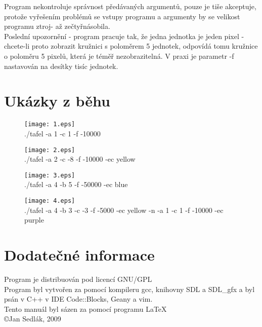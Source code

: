 \documentclass[a4paper,11pt,titlepage]{article}
\begin{document}
Program nekontroluje správnost předávaných argumentů, pouze je tiše akceptuje, protože vyřešením problémů se vstupy programu a argumenty by se velikost programu ztroj- až zečtyřnásobila.\\

Poslední upozornění - program pracuje tak, že jedna jednotka je jeden pixel - chcete-li proto zobrazit kružnici s poloměrem 5 jednotek, odpovídá tomu kružnice o poloměru 5 pixelů, která je téměř nezobrazitelná. V praxi je parametr -f nastavován na desítky tisíc jednotek.\\
\newpage
\section{Ukázky z běhu}
\begin{figure}[h]
\texttt{[image: 1.eps]}\\
./tafel -a 1 -c 1 -f -10000
\end{figure}
\begin{figure}[h]
\texttt{[image: 2.eps]}\\
./tafel -a 2 -c -8 -f -10000 -ec yellow
\end{figure}
\begin{figure}[h]
\texttt{[image: 3.eps]}\\
./tafel -a 4 -b 5 -f -50000 -ec blue
\end{figure}
\begin{figure}[h]
\texttt{[image: 4.eps]}\\
./tafel -a 4 -b 3 -c -3 -f -5000 -ec yellow -n -a 1 -c 1 -f -10000 -ec purple
\end{figure}
\newpage
\section{Dodatečné informace}
Program je distribuován pod licencí GNU/GPL\\
Program byl vytvořen za pomocí kompileru gcc, knihovny SDL a SDL\_gfx a byl psán v C++ v IDE Code::Blocks, Geany a vim.\\
Tento manuál byl sázen za pomocí programu \LaTeX\\

\copyright Jan Sedlák, 2009
\end{document}
